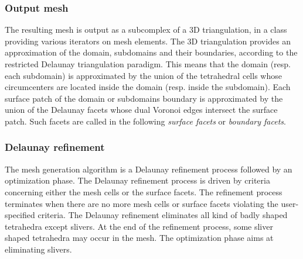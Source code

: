 
\subsubsection{Output mesh}

The resulting mesh is output as a subcomplex of a 3D triangulation,
in a class  providing various iterators
on mesh elements. The 3D triangulation provides an approximation of the
domain, subdomains and their boundaries, according to the restricted
Delaunay triangulation paradigm. This means that the domain
(resp. each subdomain) is approximated by the union of  the tetrahedral cells
 whose circumcenters are located inside the domain
(resp. inside the subdomain). 
Each surface patch of the domain or subdomains boundary is approximated
by the union of   the Delaunay facets whose dual Voronoi edges intersect the surface patch.
Such facets are called in the following {\em surface facets} or {\em boundary facets}. 

\subsubsection{Delaunay refinement}
\label{introsec:param}

The mesh generation algorithm is a Delaunay refinement process
followed by an optimization  phase.
The   Delaunay refinement process is driven by criteria
concerning either the mesh cells 
or the surface facets.
The refinement process terminates when there are
no more mesh cells or  surface facets violating the user-specified criteria.
The Delaunay refinement eliminates all kind of 
 badly shaped tetrahedra except slivers.
At the end of the refinement process,
some sliver shaped tetrahedra may occur in the mesh.
The optimization phase aims at eliminating slivers.

